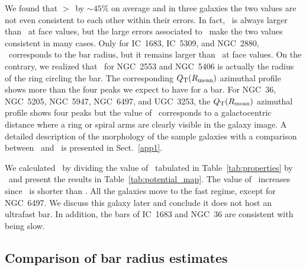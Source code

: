 \documentclass{aa}
\begin{document}
We found that \rmean$>$\rqb\ by $\sim45$\% on average and in three galaxies the two values are not even consistent to each other within their errors. In fact, \rmean\ is always larger than \rqb\ at face values, but the large errors associated to \rmean\ make the two values consistent in many cases. Only for IC~1683, IC~5309, and NGC~2880, \rmean\ corresponds to the bar radius, but it remains larger than \rqb\ at face values. On the contrary, we realized that \rmean\ for NGC~2553 and NGC~5406 is actually the radius of the ring circling the bar. The corresponding $Q_{\rm T}(R_{\rm mean})$ azimuthal profile shows more than the four peaks we expect to have for a bar. For NGC~36, NGC~5205, NGC~5947, NGC~6497, and UGC~3253, the $Q_{\rm T}(R_{\rm mean})$ azimuthal profile shows four peaks but the value of \rmean\ corresponds to a galactocentric distance where a ring or spiral arms are clearly visible in the galaxy image. A detailed description of the morphology of the sample galaxies with a comparison between \rmean\ and \rqb\ is presented in Sect.~\ref{app1}. 

We calculated \rr\ by dividing the value of \rcor\ tabulated in Table~\ref{tab:properties} by \rqb\ and present the results in Table~\ref{tab:potential_map}. The value of \rr\ increases since \rqb\ is shorter than \rmean. All the galaxies move to the fast regime, except for NGC~6497. We discuss this galaxy later and conclude it does not host an ultrafast bar. In addition, the bars of IC~1683 and NGC~36 are consistent with being slow.

\subsection{Comparison of bar radius estimates}
\end{document}
